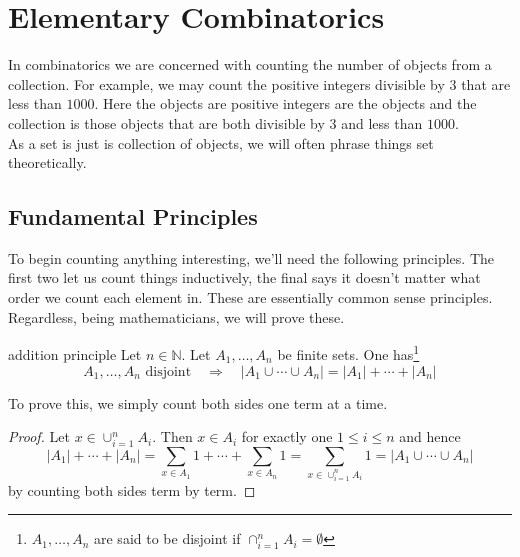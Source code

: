 \documentclass{article}
\newcounter{statementcount}
\begin{document}
\newpage

\tableofcontents

\newpage

\section{Elementary Combinatorics}

\setcounter{statementcount}{1}

In combinatorics we are concerned with counting the number of objects from a collection. For example, we may count the positive integers divisible
by $3$ that are less than $1000$. Here the objects are positive integers are the objects and the collection is those objects that are both divisible 
by $3$ and less than $1000$. \\

As a set is just is collection of objects, we will often phrase things set theoretically. 

\subsection{Fundamental Principles}


To begin counting anything interesting, we'll need the following principles. The first two let us count things inductively, the final 
says it doesn't matter what order we count each element in. These are essentially common sense principles. Regardless, being mathematicians, 
we will prove these.

\begin{theorem}[]{addition principle}
    Let $n \in \mathbb{N}$. Let $A_1, \dots, A_n$ be finite sets. One has\footnote{$A_1, \dots, A_n$ are said to be disjoint if 
    $\cap_{i=1}^n A_i = \emptyset$}
    \[A_1, \dots, A_n \text{ disjoint} \quad \Longrightarrow \quad |A_1 \cup \cdots \cup A_n| = |A_1| + \cdots + |A_n|\]
\end{theorem}

To prove this, we simply count both sides one term at a time.

\begin{proof}
    Let $x \in \cup_{i=1}^n A_i$. Then $x \in A_i$ for exactly one $1 \leq i \leq n$ and hence 
    \[|A_1| + \cdots + |A_n| =\sum_{x \in A_1}1 + \cdots + \sum_{x \in A_n}1 = \sum_{x \in \cup_{i=1}^n A_i}1 = |A_1 \cup \cdots \cup A_n|\] 
    by counting both sides term by term.
\end{proof}
\end{document}
